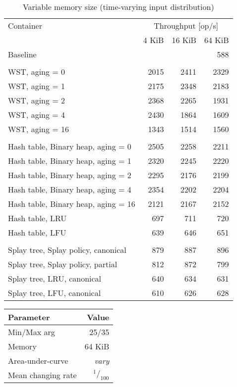\begin{table}
\caption{Variable memory size (time-varying input distribution)}
\begin{tabular}[]{l  r  r  r } \toprule
Container & \multicolumn{3}{c}{Throughput [op/s]} \\ \cmidrule(r){2-4}
& 4 KiB & 16 KiB & 64 KiB \\ \midrule
Baseline & \multicolumn{3}{r}{588}  \\
\\
WST, aging = 0 & 2015 & 2411 & 2329 \\
WST, aging = 1 & 2175 & 2348 & 2183 \\
WST, aging = 2 & 2368 & 2265 & 1931 \\
WST, aging = 4 & 2430 & 1864 & 1609 \\
WST, aging = 16 & 1343 & 1514 & 1560 \\
\\
Hash table, Binary heap, aging = 0 & 2505 & 2258 & 2211 \\
Hash table, Binary heap, aging = 1 & 2320 & 2245 & 2220 \\
Hash table, Binary heap, aging = 2 & 2295 & 2176 & 2199 \\
Hash table, Binary heap, aging = 4 & 2354 & 2202 & 2204 \\
Hash table, Binary heap, aging = 16 & 2121 & 2167 & 2152 \\
Hash table, LRU & 697 & 711 & 720 \\
Hash table, LFU & 639 & 646 & 651 \\
\\
Splay tree, Splay policy, canonical & 879 & 887 & 896 \\
Splay tree, Splay policy, partial & 812 & 872 & 799 \\
Splay tree, LRU, canonical & 640 & 634 & 631 \\
Splay tree, LFU, canonical & 610 & 626 & 628 \\
\bottomrule
\end{tabular}
\end{table}

\pagebreak

\begin{tabular}[h]{l r} \toprule
Parameter & Value \\ \midrule
Min/Max arg & 25/35 \\
Memory & 64 KiB \\
Area-under-curve & \emph{vary} \\
Mean changing rate & $^1/_{100}$ \\ \bottomrule
\end{tabular}

